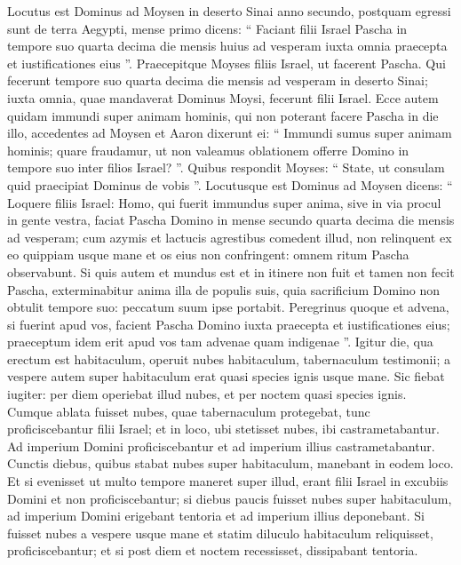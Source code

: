 \begin{biblechapter}
\begin{biblechapter}
\begin{biblechapter}
\begin{biblechapter}
\begin{biblechapter}
\begin{biblechapter}
\begin{biblechapter}
\begin{biblechapter}
\begin{biblechapter}
\verse Locutus est Dominus ad Moysen in deserto Sinai anno secundo, postquam egressi sunt de terra Aegypti, mense primo dicens: 
\verse “ Faciant filii Israel Pascha in tempore suo 
\verse quarta decima die mensis huius ad vesperam iuxta omnia praecepta et iustificationes eius ”. 
\verse Praecepitque Moyses filiis Israel, ut facerent Pascha. 
\verse Qui fecerunt tempore suo quarta decima die mensis ad vesperam in deserto Sinai; iuxta omnia, quae mandaverat Dominus Moysi, fecerunt filii Israel.
 \verse Ecce autem quidam immundi super animam hominis, qui non poterant facere Pascha in die illo, accedentes ad Moysen et Aaron 
\verse dixerunt ei: “ Immundi sumus super animam hominis; quare fraudamur, ut non valeamus oblationem offerre Domino in tempore suo inter filios Israel? ”. 
\verse Quibus respondit Moyses: “ State, ut consulam quid praecipiat Dominus de vobis ”.
 \verse Locutusque est Dominus ad Moysen dicens: 
\verse “ Loquere filiis Israel: Homo, qui fuerit immundus super anima, sive in via procul in gente vestra, faciat Pascha Domino 
\verse in mense secundo quarta decima die mensis ad vesperam; cum azymis et lactucis agrestibus comedent illud, 
\verse non relinquent ex eo quippiam usque mane et os eius non confringent: omnem ritum Pascha observabunt.
 \verse Si quis autem et mundus est et in itinere non fuit et tamen non fecit Pascha, exterminabitur anima illa de populis suis, quia sacrificium Domino non obtulit tempore suo: peccatum suum ipse portabit. 
\verse Peregrinus quoque et advena, si fuerint apud vos, facient Pascha Domino iuxta praecepta et iustificationes eius; praeceptum idem erit apud vos tam advenae quam indigenae ”.
 \verse Igitur die, qua erectum est habitaculum, operuit nubes habitaculum, tabernaculum testimonii; a vespere autem super habitaculum erat quasi species ignis usque mane. 
\verse Sic fiebat iugiter: per diem operiebat illud nubes, et per noctem quasi species ignis. 
\verse Cumque ablata fuisset nubes, quae tabernaculum protegebat, tunc proficiscebantur filii Israel; et in loco, ubi stetisset nubes, ibi castrametabantur. 
\verse Ad imperium Domini proficiscebantur et ad imperium illius castrametabantur. Cunctis diebus, quibus stabat nubes super habitaculum, manebant in eodem loco. 
\verse Et si evenisset ut multo tempore maneret super illud, erant filii Israel in excubiis Domini et non proficiscebantur; 
\verse si diebus paucis fuisset nubes super habitaculum, ad imperium Domini erigebant tentoria et ad imperium illius deponebant. 
\verse Si fuisset nubes a vespere usque mane et statim diluculo habitaculum reliquisset, proficiscebantur; et si post diem et noctem recessisset, dissipabant tentoria. 

\end{biblechapter}
\end{biblechapter}
\end{biblechapter}
\end{biblechapter}
\end{biblechapter}
\end{biblechapter}
\end{biblechapter}
\end{biblechapter}
\end{biblechapter}
